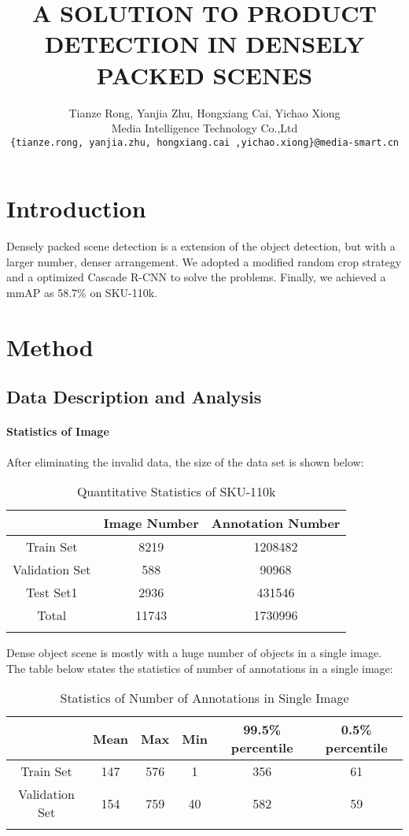 \documentclass{article}
\title{A SOLUTION TO PRODUCT DETECTION IN DENSELY PACKED SCENES}
\author{
 Tianze Rong, Yanjia Zhu, Hongxiang Cai, Yichao Xiong \\
  Media Intelligence Technology Co.,Ltd\\
  \texttt{\{tianze.rong, yanjia.zhu, hongxiang.cai ,yichao.xiong\}@media-smart.cn}
}
\begin{document}
\maketitle

\section{Introduction}
Densely packed scene detection is a extension of the object detection, but with a larger number, denser arrangement. We adopted a modified random crop strategy and a optimized Cascade R-CNN to solve the problems. Finally, we achieved a mmAP as 58.7\% on SKU-110k\cite{sku}. 
\section{Method}
\subsection{Data Description and Analysis}
\paragraph{Statistics of Image} After eliminating the invalid data, the size of the data set is shown below:
\begin{table}[htb]
    \centering
    \begin{tabular}{ccc}
    \hline
        &Image Number & Annotation Number \\
    \hline
         Train Set& 8219& 1208482\\
         Validation Set & 588 & 90968\\
         Test Set1& 2936 & 431546\\
    \hline
        Total & 11743 & 1730996\\
    \hline
    \\
    \end{tabular}
    \caption{Quantitative Statistics of SKU-110k}
    \label{tab:my_label}
\end{table}
\par Dense object scene is mostly with a huge number of objects in a single image. The table below states the statistics of number of annotations in a single image:
\begin{table}[htb]
    \centering
    \begin{tabular}{cccccc}
    \hline
        &Mean & Max & Min & 99.5\% percentile & 0.5\% percentile\\
    \hline
         Train Set& 147& 576&1&356&61\\
         Validation Set & 154 & 759&40&582&59\\

    \hline
    \\
    \end{tabular}
    \caption{Statistics of Number of Annotations in Single Image}
    \label{tab:my_label}
\end{table}
\end{document}
